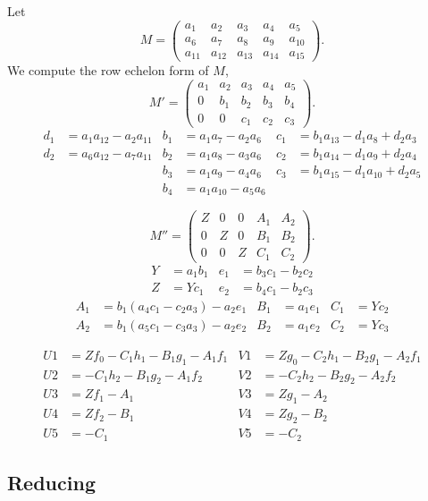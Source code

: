 Let
\[ M =
\begin{pmatrix}
  a_1 & a_2 & a_3 & a_4 & a_5 \\
  a_6 & a_7 & a_8 & a_9 & a_{10} \\
  a_{11} & a_{12} & a_{13} & a_{14} & a_{15}
\end{pmatrix}. \]
We compute the row echelon form of $M$,
\[ M' =
\begin{pmatrix}
  a_1 & a_2 & a_3 & a_4 & a_5 \\
    0 & b_1 & b_2 & b_3 & b_4 \\
    0 &   0 & c_1 & c_2 & c_3
\end{pmatrix}. \]
\begin{align*}
  d_1 &= a_1a_{12} - a_2a_{11} & b_1 &= a_1a_7    - a_2a_6 & c_1 &= b_1a_{13} - d_1a_8    + d_2a_3 \\
  d_2 &= a_6a_{12} - a_7a_{11} & b_2 &= a_1a_8    - a_3a_6 & c_2 &= b_1a_{14} - d_1a_9    + d_2a_4 \\
      &                        & b_3 &= a_1a_9    - a_4a_6 & c_3 &= b_1a_{15} - d_1a_{10} + d_2a_5 \\
      &                        & b_4 &= a_1a_{10} - a_5a_6
\end{align*}

\[ M'' =
\begin{pmatrix}
  Z & 0 & 0 & A_1 & A_2 \\
  0 & Z & 0 & B_1 & B_2 \\
  0 & 0 & Z & C_1 & C_2
\end{pmatrix}. \]
\begin{align*}
  Y &= a_1b_1 & e_1 &= b_3c_1 - b_2c_2 \\
  Z &= Yc_1   & e_2 &= b_4c_1 - b_2c_3
\end{align*}
\begin{align*}
  A_1 &= b_1(a_4c_1 - c_2a_3) - a_2e_1 & B_1 &= a_1e_1 & C_1 &= Yc_2 \\
  A_2 &= b_1(a_5c_1 - c_3a_3) - a_2e_2 & B_2 &= a_1e_2 & C_2 &= Yc_3
\end{align*}

\begin{align*}
  U1 &= Zf_0 - C_1h_1 - B_1g_1 - A_1f_1 & V1 &= Zg_0 - C_2h_1 - B_2g_1 - A_2f_1 \\
  U2 &=      - C_1h_2 - B_1g_2 - A_1f_2 & V2 &=      - C_2h_2 - B_2g_2 - A_2f_2 \\
  U3 &= Zf_1 - A_1 & V3 &= Zg_1 - A_2 \\
  U4 &= Zf_2 - B_1 & V4 &= Zg_2 - B_2 \\
  U5 &=      - C_1 & V5 &=      - C_2
\end{align*}


\subsection{Reducing}
